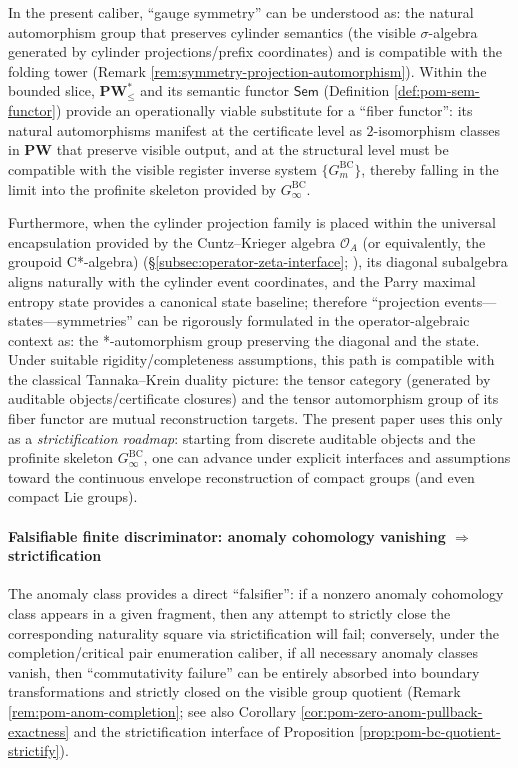 \begin{remark}\label{rem:pom-tannaka-krein-roadmap}
In the present caliber, ``gauge symmetry'' can be understood as: the natural automorphism group that preserves cylinder semantics (the visible \(\sigma\)-algebra generated by cylinder projections/prefix coordinates) and is compatible with the folding tower (Remark \ref{rem:symmetry-projection-automorphism}).
Within the bounded slice, \(\mathbf{PW}^{\ast}_{\le}\) and its semantic functor \(\mathsf{Sem}\) (Definition \ref{def:pom-sem-functor}) provide an operationally viable substitute for a ``fiber functor'':
its natural automorphisms manifest at the certificate level as \(2\)-isomorphism classes in \(\mathbf{PW}\) that preserve visible output, and at the structural level must be compatible with the visible register inverse system \(\{G_m^{\mathrm{BC}}\}\), thereby falling in the limit into the profinite skeleton provided by \(G_\infty^{\mathrm{BC}}\).
\par
Furthermore, when the cylinder projection family is placed within the universal encapsulation provided by the Cuntz--Krieger algebra \(\mathcal{O}_A\) (or equivalently, the groupoid C*-algebra) (\S\ref{subsec:operator-zeta-interface}; \cite{CuntzKrieger1980}), its diagonal subalgebra aligns naturally with the cylinder event coordinates, and the Parry maximal entropy state provides a canonical state baseline;
therefore ``projection events---states---symmetries'' can be rigorously formulated in the operator-algebraic context as: the *-automorphism group preserving the diagonal and the state.
Under suitable rigidity/completeness assumptions, this path is compatible with the classical Tannaka--Krein duality picture: the tensor category (generated by auditable objects/certificate closures) and the tensor automorphism group of its fiber functor are mutual reconstruction targets.
The present paper uses this only as a \emph{strictification roadmap}: starting from discrete auditable objects and the profinite skeleton \(G_\infty^{\mathrm{BC}}\), one can advance under explicit interfaces and assumptions toward the continuous envelope reconstruction of compact groups (and even compact Lie groups).
\end{remark}

\paragraph{Falsifiable finite discriminator: anomaly cohomology vanishing \texorpdfstring{$\Rightarrow$}{=>} strictification}
The anomaly class provides a direct ``falsifier'': if a nonzero anomaly cohomology class appears in a given fragment, then any attempt to strictly close the corresponding naturality square via strictification will fail;
conversely, under the completion/critical pair enumeration caliber, if all necessary anomaly classes vanish, then ``commutativity failure'' can be entirely absorbed into boundary transformations and strictly closed on the visible group quotient (Remark \ref{rem:pom-anom-completion}; see also Corollary \ref{cor:pom-zero-anom-pullback-exactness} and the strictification interface of Proposition \ref{prop:pom-bc-quotient-strictify}).

